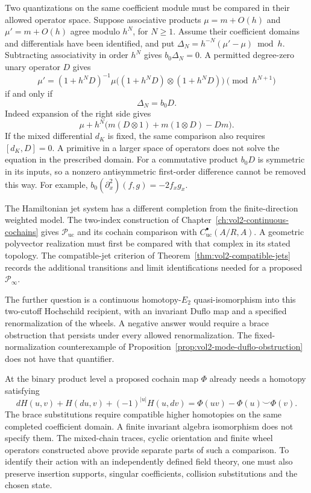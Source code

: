 Two quantizations on the same coefficient module
must be compared in their allowed operator space.
Suppose associative products $\mu=m+O(h)$ and
$\mu'=m+O(h)$ agree modulo $h^N$, for $N\geq1$.
Assume their coefficient domains and differentials
have been identified, and put
$\Delta_N=h^{-N}(\mu'-\mu)\bmod h$.
Subtracting associativity in order $h^N$ gives
$b_0\Delta_N=0$.
A permitted degree-zero unary operator $D$ gives
\[
 \mu'=(1+h^ND)^{-1}
        \mu\bigl((1+h^ND)\otimes(1+h^ND)\bigr)
                      \pmod{h^{N+1}}
\]
if and only if
\begin{equation}\label{eq:vol2-unary-gauge-equation}
 \Delta_N=b_0D.
\end{equation}
Indeed expansion of the right side gives
\[
 \mu+h^N\bigl(m(D\otimes1)+m(1\otimes D)-Dm\bigr).
\]
If the mixed differential $d_K$ is fixed, the
same comparison also requires $[d_K,D]=0$.
A primitive in a larger space of operators does
not solve the equation in the prescribed domain.
For a commutative product $b_0D$ is symmetric in
its inputs, so a nonzero antisymmetric first-order
difference cannot be removed this way.
For example,
$b_0(\partial_x^2)(f,g)=-2f_xg_x$.

The Hamiltonian jet system has a different
completion from the finite-direction weighted
model. The two-index construction of
Chapter~\ref{ch:vol2-continuous-cochains}
gives $\mathcal P_{\mathrm{uc}}$ and its cochain
comparison with $C^\bullet_{\mathrm{uc}}(A/R,A)$.
A geometric polyvector realization must first be
compared with that complex in its stated topology.
The compatible-jet criterion of
Theorem~\ref{thm:vol2-compatible-jets} records the
additional transitions and limit identifications
needed for a proposed $\mathcal P_\infty$.

The further question is a continuous
homotopy-$E_2$ quasi-isomorphism into this
two-cutoff Hochschild recipient, with an invariant
Duflo map and a specified renormalization of the
wheels. A negative answer would require a brace
obstruction that persists under every allowed
renormalization. The fixed-normalization
counterexample of
Proposition~\ref{prop:vol2-mode-duflo-obstruction}
does not have that quantifier.

At the binary product level a proposed cochain
map $\Phi$ already needs a homotopy satisfying
\[
 dH(u,v)+H(du,v)+(-1)^{|u|}H(u,dv)
   =\Phi(uv)-\Phi(u)\smile\Phi(v).
\]
The brace substitutions require compatible higher
homotopies on the same completed coefficient
domain. A finite invariant algebra isomorphism
does not specify them.
The mixed-chain traces, cyclic orientation and
finite wheel operators constructed above provide
separate parts of such a comparison.
To identify their action with an independently
defined field theory, one must also preserve
insertion supports, singular coefficients,
collision substitutions and the chosen state.

